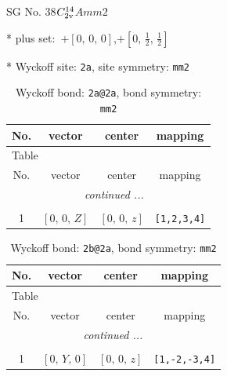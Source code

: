 \documentclass[fleqn,8pt]{jsarticle}
\begin{document}
\setcounter{MaxMatrixCols}{32}

\renewcommand{\tablename}{Table~}
\renewcommand{\figurename}{Figure~}
\begin{center}
\LARGE
SG No. 38\quad$C_{\rm 2v}^{14}$\quad$Amm2$\quad[ orthorhombic ]
\end{center}

* plus set:\,\,\,$+\left[ 0,\, 0,\, 0 \right]$,\quad $+\left[ 0,\, \frac{1}{2},\, \frac{1}{2} \right]$


* Wyckoff site: {\tt 2a}, site symmetry: {\tt mm2}
\renewcommand{\arraystretch}{1.2}
\begin{longtable}{cccc}
\caption{Wyckoff bond: {\tt 2a@2a}, bond symmetry: {\tt mm2}}
 \\
 \hline \hline
No. & vector & center & mapping \\ \hline \endfirsthead

\multicolumn{3}{l}{\tablename\ \thetable{}} \\
 \hline \hline
No. & vector & center & mapping \\ \hline \endhead

 \hline \hline
\multicolumn{3}{r}{\footnotesize\it continued ...} \\ \endfoot

 \hline \hline
\multicolumn{3}{r}{} \\ \endlastfoot

1 & $\left[ 0,\, 0,\, Z \right]$ & $\left[ 0,\, 0,\, z \right]$ & {\tt [1,2,3,4]} \\
\end{longtable}
\renewcommand{\arraystretch}{1.2}
\begin{longtable}{cccc}
\caption{Wyckoff bond: {\tt 2b@2a}, bond symmetry: {\tt mm2}}
 \\
 \hline \hline
No. & vector & center & mapping \\ \hline \endfirsthead

\multicolumn{3}{l}{\tablename\ \thetable{}} \\
 \hline \hline
No. & vector & center & mapping \\ \hline \endhead

 \hline \hline
\multicolumn{3}{r}{\footnotesize\it continued ...} \\ \endfoot

 \hline \hline
\multicolumn{3}{r}{} \\ \endlastfoot

1 & $\left[ 0,\, Y,\, 0 \right]$ & $\left[ 0,\, 0,\, z \right]$ & {\tt [1,-2,-3,4]} \\
\end{longtable}
\end{document}
